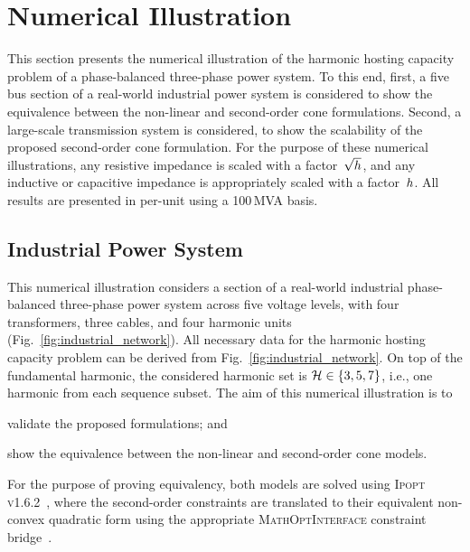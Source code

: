 \section{Numerical Illustration}
\label{sec:numerical_illustration}

This section presents the numerical illustration of the harmonic hosting capacity problem of a phase-balanced three-phase power system. To this end, first, a five bus section of a real-world industrial power system is considered to show the equivalence between the non-linear and second-order cone formulations. Second, a large-scale transmission system is considered, to show the scalability of the proposed second-order cone formulation. For the purpose of these numerical illustrations, any resistive impedance is scaled with a factor~$\sqrt{h}$, and any inductive or capacitive impedance is appropriately scaled with a factor~$h$. All results are presented in per-unit using a 100\,MVA basis.

\subsection{Industrial Power System}
\label{sec:industrial_power_system}

This numerical illustration considers a section of a real-world industrial phase-balanced three-phase power system across five voltage levels, with four transformers, three cables, and four harmonic units (Fig.~\ref{fig:industrial_network}). All necessary data for the harmonic hosting capacity problem can be derived from Fig.~\ref{fig:industrial_network}. On top of the fundamental harmonic, the considered harmonic set is $\mathcal{H} \in \{3,5,7\}$, i.e., one harmonic from each sequence subset. The aim of this numerical illustration is to 
\begin{enumerate*}
    \item validate the proposed formulations; and
    \item show the equivalence between the non-linear and second-order cone models.
\end{enumerate*}
For the purpose of proving equivalency, both models are solved using \textsc{Ipopt v1.6.2}~\cite{wachter_implementation_2006}, where the second-order constraints are translated to their equivalent non-convex quadratic form using the appropriate \textsc{MathOptInterface} constraint bridge~\cite{legat_mathoptinterface_2021}. 

